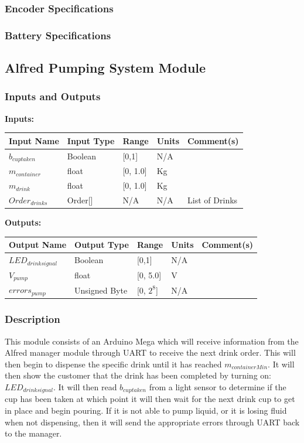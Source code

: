 \documentclass [10pt]{article}
\begin{document}
\subsubsection{Encoder Specifications}

\subsubsection{Battery Specifications}

\subsection{Alfred Pumping System Module}

\subsubsection{Inputs and Outputs}

\textbf{Inputs: } 

\begin{longtable}{|l|l|l|l|l|}\hline 
		\rowcolor{tableCell}Input Name & Input Type & Range & Units & Comment(s) \\ \hline
		$ b_{cuptaken } $ & Boolean & [0,1] & N/A &  \\ \hline
		$ m_{container} $ & float & [0, 1.0]& Kg & \\ \hline
		$ m_{drink} $    & float & [0, 1.0] & Kg &  \\ \hline
		$ Order_{drinks} $ & Order[] & N/A  & N/A & List of Drinks  \\ \hline
\end{longtable}
\textbf{Outputs: } 
\begin{longtable}{|l|l|l|l|l|}\hline 
	\rowcolor{tableCell}Output Name & Output Type & Range & Units & Comment(s) \\ \hline
	$ LED_{drinksignal} $ & Boolean & [0,1] & N/A &  \\ \hline
	$ V_{pump } $ & float & [0, 5.0]& V & \\ \hline
	$  errors_{pump} $ & Unsigned Byte & [0, $2^{8}$]& N/A & \\ \hline
\end{longtable}
\subsubsection{Description}
This module consists of an Arduino Mega which will receive information from the Alfred manager module through UART to receive the next drink order. This will then begin to dispense the specific drink until it has reached $ m_{containerMin} $. It will then show the customer that the drink has been completed by turning on: $ LED_{drinksignal} $. It will then read $ b_{cuptaken} $ from a light sensor to determine if the cup has been taken at which point it will then wait for the next drink cup to get in place and begin pouring. If it is not able to pump liquid, or it is losing fluid when not dispensing, then it will send the appropriate errors through UART back to the manager.
\end{document}
